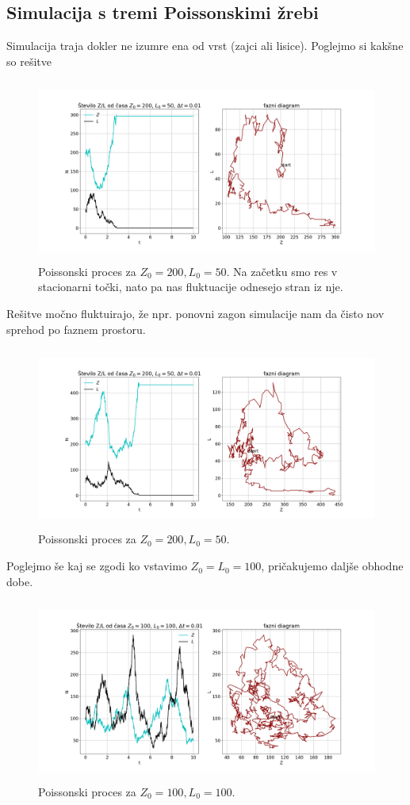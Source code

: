 \documentclass[11pt, a4paper]{article}
\begin{document}
\subsection{Simulacija s tremi Poissonskimi žrebi}
Simulacija traja dokler ne izumre ena od vrst (zajci ali lisice). Poglejmo si kakšne so rešitve
\begin{figure}[H]
\centering

  \includegraphics[width=18cm, height=6cm]{tretja_1.png}
  \caption{Poissonski proces za $Z_0 = 200 , L_0 = 50$. Na začetku smo res v stacionarni točki, nato pa nas fluktuacije odnesejo stran iz nje.}

   
 \end{figure}
 Rešitve močno fluktuirajo, že npr. ponovni zagon simulacije nam da čisto nov sprehod po faznem prostoru.
 \begin{figure}[H]
\centering

  \includegraphics[width=18cm, height=6cm]{tretja_2.png}
  \caption{Poissonski proces za $Z_0 =200, L_0 = 50$.}

   
 \end{figure}
 Poglejmo še kaj se zgodi ko vstavimo $Z_0=L_0=100$, pričakujemo daljše obhodne dobe.
 \begin{figure}
   \includegraphics[width=18cm, height=6cm]{tretja_3.png}
  \caption{Poissonski proces za $Z_0 = 100 , L_0 = 100$.}

   
 \end{figure}
\end{document}
